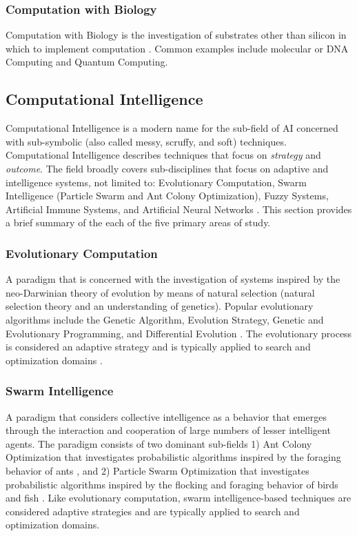 \begin{bibunit}
\subsubsection{Computation with Biology}
Computation with Biology is the investigation of substrates other than silicon in which to implement computation \cite{Aaronson2005}. Common examples include molecular or DNA Computing and Quantum Computing.

% 
% 
\subsection{Computational Intelligence}
\label{sec:computationl_intelligence}
Computational Intelligence is a modern name for the sub-field of AI concerned with sub-symbolic (also called messy, scruffy, and soft) techniques. Computational Intelligence describes techniques that focus on \emph{strategy} and \emph{outcome}. 
The field broadly covers sub-disciplines that focus on adaptive and intelligence systems, not limited to: Evolutionary Computation, Swarm Intelligence (Particle Swarm and Ant Colony Optimization), Fuzzy Systems, Artificial Immune Systems, and Artificial Neural Networks \cite{Engelbrecht2007, Pedrycz1997}. This section provides a brief summary of the each of the five primary areas of study.

\subsubsection{Evolutionary Computation} 
A paradigm that is concerned with the investigation of systems inspired by the neo-Darwinian theory of evolution by means of natural selection (natural selection theory and an understanding of genetics). Popular evolutionary algorithms include the Genetic Algorithm, Evolution Strategy, Genetic and Evolutionary Programming, and Differential Evolution \cite{Baeck2000, Baeck2000a}. The evolutionary process is considered an adaptive strategy and is typically applied to search and optimization domains \cite{Goldberg1989, Holland1975}.

\subsubsection{Swarm Intelligence} 
A paradigm that considers collective intelligence as a behavior that emerges through the interaction and cooperation of large numbers of lesser intelligent agents. The paradigm consists of two dominant sub-fields 1) Ant Colony Optimization that investigates probabilistic algorithms inspired by the foraging behavior of ants \cite{Bonabeau1999, Dorigo2004}, and 2) Particle Swarm Optimization that investigates probabilistic algorithms inspired by the flocking and foraging behavior of birds and fish \cite{Kennedy2001}. Like evolutionary computation, swarm intelligence-based techniques are considered adaptive strategies and are typically applied to search and optimization domains.


\end{bibunit}
